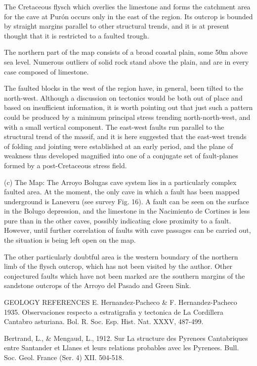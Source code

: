 \documentclass[11pt, a4paper, twoside]{memoir}
\begin{document}
The Cretaceous flysch which overlies the limestone and forms the catchment area for the cave at Purón occurs only in the east of the region. Its outcrop is bounded by straight margins parallel to other structural trends, and it is at present thought that it is restricted to a faulted trough.

The northern part of the map consists of a broad coastal plain, some 50m above sea level. Numerous outliers of solid rock stand above the plain, and are in every case composed of limestone.

The faulted blocks in the west of the region have, in general, been tilted to the north-west. Although a discussion on tectonics would be both out of place and based on insufficient information, it is worth pointing out that just such a pattern could be produced by a minimum principal stress trending north-north-west, and with a small vertical component. The east-west faults run parallel to the structural trend of the massif, and it is here suggested that the east-west trends of folding and jointing were established at an early period, and the plane of weakness thus developed magnified into one of a conjugate set of fault-planes formed by a post-Cretaceous stress field.

(c) The Map: The Arroyo Bolugas cave system lies in a particularly complex faulted area. At the moment, the only cave in which a fault has been mapped underground is Laneveru (see survey Fig. 16). A fault can be seen on the surface in the Bolugo depression, and the limestone in the Nacimiento de Cortines is less pure than in the other caves, possibly indicating close proximity to a fault. However, until further correlation of faults with cave passages can be carried out, the situation is being left open on the map.

The other particularly doubtful area is the western boundary of the northern limb of the flysch outcrop, which has not been visited by the author. Other conjectured faults which have not been marked are the southern margins of the sandstone outcrops of the Arroyo del Pasado and Green Sink.



GEOLOGY REFERENCES
E. Hernandez-Pacheco \& F. Hernandez-Pacheco 1935. Observaciones respecto a estratigrafia y tectonica de La Cordillera Cantabro asturiana. Bol. R. Soc. Esp. Hist. Nat. XXXV, 487-499.

Bertrand, L., \& Mengaud, L., 1912. Sur La structure des Pyrenees Cantabriques entre Santander et Llanes et leurs relations probables avec les Pyrenees. Bull. Soc. Geol. France (Ser. 4) XII. 504-518.
\end{document}
